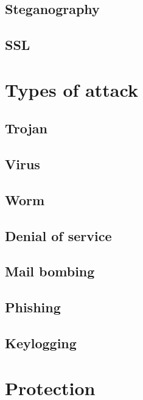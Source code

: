 \documentclass[a4paper,oneside]{report}
\begin{document}
    	\subsection{Steganography}
    	\subsection{SSL}
  	\section{Types of attack}
    	\subsection{Trojan}
    	\subsection{Virus}
    	\subsection{Worm}
    	\subsection{Denial of service}
    	\subsection{Mail bombing}
    	\subsection{Phishing}
    	\subsection{Keylogging}
  	\section{Protection}
\end{document}
